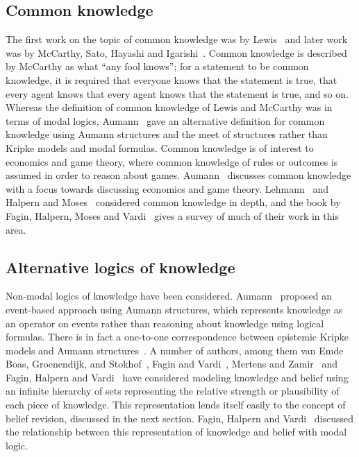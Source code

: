 \subsection{Common knowledge}

The first work on the topic of common knowledge was by Lewis~\cite{lewis:1969}
and later work was by McCarthy, Sato, Hayashi and Igarishi~\cite{mccarthy:1979}.
Common knowledge is described by McCarthy as what ``any fool knows''; for a
statement to be common knowledge, it is required that everyone knows that the
statement is true, that every agent knows that every agent knows that the
statement is true, and so on. Whereas the definition of common knowledge of
Lewis and McCarthy was in terms of modal logics, Aumann~\cite{aumann:1976} gave
an alternative definition for common knowledge using Aumann structures and the
meet of structures rather than Kripke models and modal formulas. Common
knowledge is of interest to economics and game theory, where common knowledge of
rules or outcomes is assumed in order to reason about games.
Aumann~\cite{aumann:1976} discusses common knowledge with a focus towards
discussing economics and game theory.  Lehmann~\cite{lehmann:1984} and Halpern
and Moses~\cite{halpern:1985} considered common knowledge in depth, and the book
by Fagin, Halpern, Moses and Vardi~\cite{fagin:1995} gives a survey of much of
their work in this area.

\subsection{Alternative logics of knowledge}

Non-modal logics of knowledge have been considered.  Aumann~\cite{aumann:1976}
proposed an event-based approach using Aumann structures, which represents
knowledge as an operator on events rather than reasoning about knowledge using
logical formulas. There is in fact a one-to-one correspondence between epistemic
Kripke models and Aumann structures~\cite{fagin:1995}. A number of authors, among
them van Emde Boas, Groenendijk, and Stokhof~\cite{vanemdeboas:1980}, Fagin and
Vardi~\cite{fagin:1985}, Mertens and Zamir~\cite{mertens:1985} and Fagin, Halpern
and Vardi~\cite{fagin:1991} have considered modeling knowledge and belief using
an infinite hierarchy of sets representing the relative strength or plausibility
of each piece of knowledge. This representation lends itself easily to the
concept of belief revision, discussed in the next section. Fagin, Halpern and
Vardi~\cite{fagin:1991} discussed the relationship between this representation
of knowledge and belief with modal logic.


